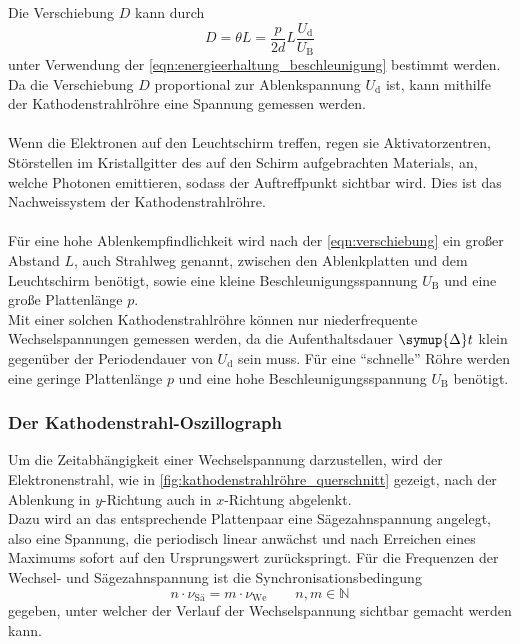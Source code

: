     Die Verschiebung $D$ kann durch
    \begin{equation}
        D = \theta L = \frac{p}{2d} L \frac{U_\text{d}}{U_\text{B}}
        \label{eqn:verschiebung}
    \end{equation}
    unter Verwendung der \autoref{eqn:energieerhaltung_beschleunigung} bestimmt werden.\\
    Da die Verschiebung $D$ proportional zur Ablenkspannung $U_\text{d}$ ist,
    kann mithilfe der Kathodenstrahlröhre eine Spannung gemessen werden.\\
    \\
    Wenn die Elektronen auf den Leuchtschirm treffen,
    regen sie Aktivatorzentren,
    Störstellen im Kristallgitter des auf den Schirm aufgebrachten Materials,
    an,
    welche Photonen emittieren,
    sodass der Auftreffpunkt sichtbar wird.
    Dies ist das Nachweissystem der Kathodenstrahlröhre.\\
    \\
    Für eine hohe Ablenkempfindlichkeit wird nach der \autoref{eqn:verschiebung} ein großer Abstand $L$,
    auch Strahlweg genannt,
    zwischen den Ablenkplatten und dem Leuchtschirm benötigt,
    sowie eine kleine Beschleunigungsspannung $U_\text{B}$ und eine große Plattenlänge $p$.\\
    Mit einer solchen Kathodenstrahlröhre können nur niederfrequente Wechselspannungen gemessen werden,
    da die Aufenthaltsdauer $\symup{\Delta}t$ klein gegenüber der Periodendauer von $U_\text{d}$ sein muss.
    Für eine \enquote{schnelle} Röhre werden eine geringe Plattenlänge $p$ und eine hohe Beschleunigungsspannung $U_\text{B}$ benötigt.

\subsubsection{Der Kathodenstrahl-Oszillograph}
\label{sec:oszillograph}

    Um die Zeitabhängigkeit einer Wechselspannung darzustellen,
    wird der Elektronenstrahl,
    wie in \autoref{fig:kathodenstrahlröhre_querschnitt} gezeigt,
    nach der Ablenkung in $y$-Richtung auch in $x$-Richtung abgelenkt.\\
    Dazu wird an das entsprechende Plattenpaar eine Sägezahnspannung angelegt,
    also eine Spannung,
    die periodisch linear anwächst und nach Erreichen eines Maximums sofort auf den Ursprungswert zurückspringt.
    Für die Frequenzen der Wechsel- und Sägezahnspannung ist die Synchronisationsbedingung
    \begin{equation}
        n \cdot \nu_\text{Sä} = m \cdot \nu_\text{We} \qquad n,m \in \mathbb{N}
        \label{eqn:synchronisationsbedingung}
    \end{equation}
    gegeben,
    unter welcher der Verlauf der Wechselspannung sichtbar gemacht werden kann.

